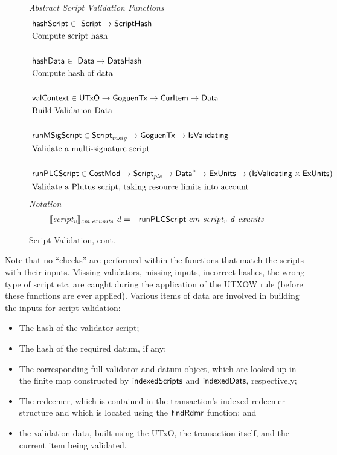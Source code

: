 \begin{figure*}[htb]
  \emph{Abstract Script Validation Functions}
  \begin{align*}
     &\mathsf{hashScript} \in  ~\mathsf{Script}\to \mathsf{ScriptHash} \\
     &\text{Compute script hash} \\~\\
     &\mathsf{hashData} \in  ~\mathsf{Data} \to \mathsf{DataHash} \\
     &\text{Compute hash of data} \\~\\
     &\mathsf{valContext} \in  \mathsf{UTxO} \to \mathsf{GoguenTx} \to \mathsf{CurItem} \to \mathsf{Data} \\
     &\text{Build Validation Data} \\~\\
     &\mathsf{runMSigScript} \in\mathsf{Script}_{msig}\to \mathsf{GoguenTx} \to \mathsf{IsValidating}  \\
     &\text{Validate a multi-signature script} \\~\\
     &\mathsf{runPLCScript} \in \mathsf{CostMod} \to\mathsf{Script}_{plc} \to
    \mathsf{Data}^{*} \to \mathsf{ExUnits} \to (\mathsf{IsValidating} \times \mathsf{ExUnits}) \\
     &\text{Validate a Plutus script, taking resource limits into account}
  \end{align*}
  \emph{Notation}
  \begin{align*}
    \llbracket \mathit{script_v} \rrbracket_{\mathit{cm},\mathit{exunits}}~\mathit{d}
    &=& \mathsf{runPLCScript} ~{cm}~\mathit{script_v}~\mathit{d}~\mathit{exunits}
  \end{align*}
  \caption{Script Validation, cont.}
  \label{fig:defs:functions-valid}
\end{figure*}

Note that no ``checks'' are performed within the functions that match the
scripts with their inputs. Missing validators, missing inputs, incorrect hashes, the wrong type of script etc,
are caught during the application of the UTXOW rule (before these functions are ever applied).
%
Various items of data are involved in building the inputs for script validation:

\begin{itemize}
\item The hash of the validator script;

\item The hash of the required datum, if any;

\item The corresponding full validator and datum object, which are looked up in the finite map
constructed by $\mathsf{indexedScripts}$ and $\mathsf{indexedDats}$, respectively;

\item The redeemer, which is contained in the transaction's indexed redeemer structure
and which is located using the $\mathsf{findRdmr}$ function; and

\item the validation data, built using the UTxO, the transaction itself,
and the current item being validated.
\end{itemize}


